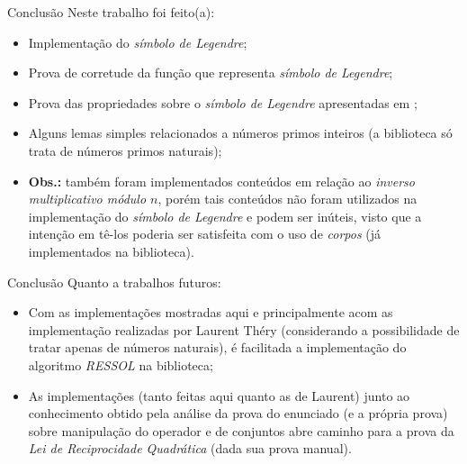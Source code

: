 \begin{frame}{Conclusão}
    Neste trabalho foi feito(a):
    \begin{itemize}
        \item Implementação do \textit{símbolo de Legendre};
        \item Prova de corretude da função que representa \textit{símbolo de Legendre};
        \item Prova das propriedades sobre o \textit{símbolo de Legendre} apresentadas em \cite{book:2399854};
        \item Alguns lemas simples relacionados a números primos inteiros (a biblioteca só trata de números primos naturais);
        
        \item[] \textbf{Obs.:} também foram implementados conteúdos em relação ao \textit{inverso multiplicativo módulo $n$}, porém tais conteúdos não foram utilizados na implementação do \textit{símbolo de Legendre} e podem ser inúteis, visto que a intenção em tê-los poderia ser satisfeita com o uso de \textit{corpos} (já implementados na biblioteca).
    \end{itemize}
\end{frame}

\begin{frame}{Conclusão}
    Quanto a trabalhos futuros:
    \begin{itemize}
        \item Com as implementações mostradas aqui e principalmente acom as implementação realizadas por Laurent Théry (considerando a possibilidade de tratar apenas de números naturais), é facilitada a implementação do algoritmo \textit{RESSOL} na biblioteca;
        \item As implementações (tanto feitas aqui quanto as de Laurent) junto ao conhecimento obtido pela análise da prova do enunciado  (e a própria prova) sobre manipulação do operador  e de conjuntos abre caminho para a prova da \textit{Lei de Reciprocidade Quadrática} (dada sua prova manual).
    \end{itemize}
\end{frame}
